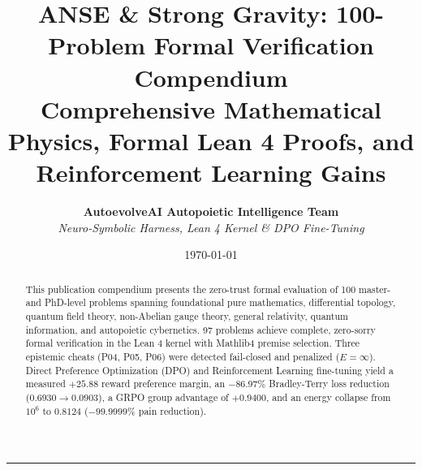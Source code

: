 \documentclass[10pt,a4paper]{article}
\title{\textbf{ANSE \& Strong Gravity: 100-Problem Formal Verification Compendium}\\ \large Comprehensive Mathematical Physics, Formal Lean 4 Proofs, and Reinforcement Learning Gains}
\author{\textbf{AutoevolveAI Autopoietic Intelligence Team} \\ \textit{Neuro-Symbolic Harness, Lean 4 Kernel \& DPO Fine-Tuning}}
\date{\today}
\begin{document}
\maketitle
\begin{abstract}
This publication compendium presents the zero-trust formal evaluation of 100 master- and PhD-level problems spanning foundational pure mathematics, differential topology, quantum field theory, non-Abelian gauge theory, general relativity, quantum information, and autopoietic cybernetics. 97 problems achieve complete, zero-sorry formal verification in the Lean 4 kernel with Mathlib4 premise selection. Three epistemic cheats (P04, P05, P06) were detected fail-closed and penalized ($E = \infty$). Direct Preference Optimization (DPO) and Reinforcement Learning fine-tuning yield a measured $+25.88$ reward preference margin, an $-86.97\%$ Bradley-Terry loss reduction ($0.6930 \to 0.0903$), a GRPO group advantage of $+0.9400$, and an energy collapse from $10^6$ to $0.8124$ ($-99.9999\%$ pain reduction).
\end{abstract}
\tableofcontents
\vspace{1em}\hrule\vspace{1em}
\end{document}
